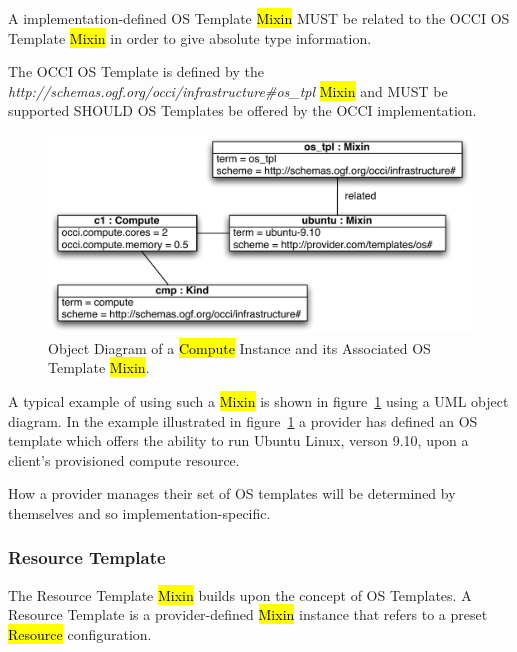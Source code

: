 \documentclass[10pt,a4paper]{article}
\begin{document}
A implementation-defined OS Template \hl{Mixin} MUST be related to the
OCCI OS Template \hl{Mixin} in order to give absolute type
information.

The OCCI OS Template is defined by the
\textit{http://schemas.ogf.org/occi/infrastructure\#os\_tpl}
\hl{Mixin} and MUST be supported SHOULD OS Templates be offered by the
OCCI implementation.

\begin{figure}[!h]
	\centering
	\includegraphics[scale=0.5]{figs/infra_template_obj_diag1}
	\caption{Object Diagram of a \hl{Compute} Instance and its Associated OS Template \hl{Mixin}.}
	\label{fig:infra_template_obj_diag1}
\end{figure}


A typical example of using such a \hl{Mixin} is shown in
figure~\ref{fig:infra_template_obj_diag1} using a UML object diagram.
In the example illustrated in
figure~\ref{fig:infra_template_obj_diag1} a provider has defined an OS
template which offers the ability to run Ubuntu Linux, verson 9.10,
upon a client's provisioned compute resource.

How a provider manages their set of OS templates will be determined by
themselves and so implementation-specific.

\subsubsection{Resource Template}
The Resource Template \hl{Mixin} builds upon the concept of OS
Templates. A Resource Template is a provider-defined \hl{Mixin}
instance that refers to a preset \hl{Resource} configuration.
\end{document}
